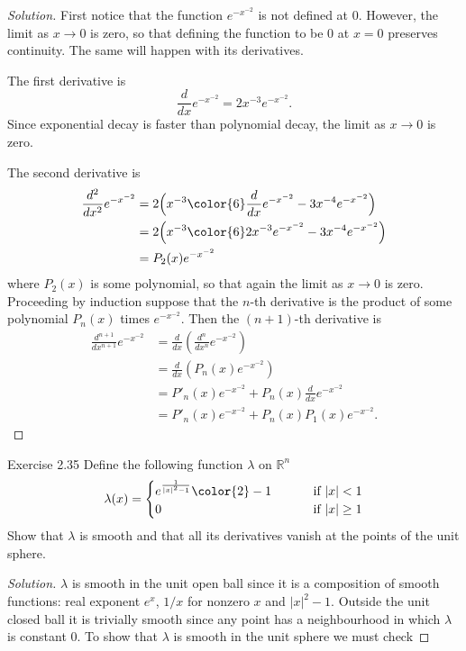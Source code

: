 \begin{proof}[Solution]\leavevmode
	First notice that the function \(e^{-x^{-2}}\) is not defined at 0. However, the limit as \(x \to 0\) is zero, so that defining the function to be 0 at \(x=0\) preserves continuity. The same will happen with its derivatives.

	The first derivative is
	\[\frac{d}{dx}e^{-x^{-2}}=2x^{-3}e^{-x^{-2}}.\]
Since exponential decay is faster than polynomial decay, the limit as \(x \to 0\) is zero.

	The second derivative is
\begin{align*}
	\frac{d^2}{dx^2}e^{-x^{-2}}&=2\Big(x^{-3}{\color{6}\frac{d}{dx}e^{-x^{-2}}}-3x^{-4}e^{-x^{-2}}\Big)\\
&=2\Big(x^{-3}{\color{6}2x^{-3}e^{-x^{-2}}}-3x^{-4}e^{-x^{-2}}\Big)\\
&=P_2(x)e^{-x^{-2}}
\end{align*}
where \(P_2(x)\) is some polynomial, so that again the limit as \(x \to 0\) is zero. Proceeding by induction suppose that the \(n\)-th derivative is the product of some polynomial \(P_n(x)\) times \(e^{-x^{-2}}\). Then the \((n+1)\)-th derivative is
\begin{align*}
	\frac{d^{n+1}}{dx^{n+1}}e^{-x^{-2}}&=\frac{d}{dx}\left(\frac{d^n}{dx^n}e^{-x^{-2}}\right)\\
&=\frac{d}{dx}\left(P_n(x)e^{-x^{-2}}\right)\\
&=P'_n(x)e^{-x^{-2}}+P_n(x)\frac{d}{dx}e^{-x^{-2}}\\
&=P'_n(x)e^{-x^{-2}}+P_n(x)P_1(x)e^{-x^{-2}}.
\end{align*}
\end{proof}

\begin{thing4}{Exercise 2.35}\label{exer:2.35}\leavevmode
Define the following function \(\lambda\) on \(\mathbb{R}^n\) 
\[\lambda(x)=\begin{cases}
	e^{\frac{1}{|x|^2-1}}{\color{2}-1}\qquad &\text{ if } |x|<1 \\
	0\qquad &\text{ if } |x|\geq 1
\end{cases}\]
Show that \(\lambda\) is smooth and that all its derivatives vanish at the points of the unit sphere.
\end{thing4}

\begin{proof}[Solution]\leavevmode
\(\lambda\) is smooth in the unit open ball since it is a composition of smooth functions: real exponent \(e^x\), \(1/x\) for nonzero  $x$ and \(|x|^2-1\). Outside the unit closed ball it is trivially smooth since any point has a neighbourhood in which \(\lambda\) is constant 0. To show that \(\lambda\) is smooth in the unit sphere we must check 
\end{proof}

